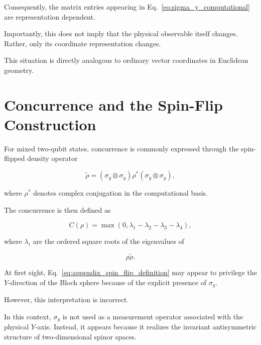 Consequently, the matrix entries appearing in Eq.~\eqref{eq:sigma_y_computational} are representation dependent.

\medskip

Importantly, this does not imply that the physical observable itself changes. Rather, only its coordinate representation changes.

This situation is directly analogous to ordinary vector coordinates in Euclidean geometry.


\section*{Concurrence and the Spin-Flip Construction}

For mixed two-qubit states, concurrence is commonly expressed through the spin-flipped density operator

\begin{equation}
\tilde{\rho}
=
(\sigma_y \otimes \sigma_y)
\rho^*
(\sigma_y \otimes \sigma_y),
\label{eq:appendix_spin_flip_definition}
\end{equation}

where \( \rho^* \) denotes complex conjugation in the computational basis.

The concurrence is then defined as

\begin{equation}
C(\rho)
=
\max
\left(
0,
\lambda_1-\lambda_2-\lambda_3-\lambda_4
\right),
\label{eq:appendix_concurrence_definition}
\end{equation}

where \( \lambda_i \) are the ordered square roots of the eigenvalues of

\[
\rho \tilde{\rho}.
\]

\medskip

At first sight, Eq.~\eqref{eq:appendix_spin_flip_definition} may appear to privilege the \( Y \)-direction of the Bloch sphere because of the explicit presence of \( \sigma_y \).

However, this interpretation is incorrect.

In this context, \( \sigma_y \) is not used as a measurement operator associated with the physical \( Y \)-axis. Instead, it appears because it realizes the invariant antisymmetric structure of two-dimensional spinor spaces.

